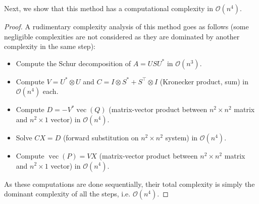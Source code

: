 \documentclass[11pt]{article}
\newcommand{\kp}{\otimes}
\DeclareMathOperator{\vect}{vec}
\newcommand{\bo}{\mathcal{O}}
\begin{document}
Next, we show that this method has a computational complexity in \(\bo(n^4)\).
\begin{proof}
A rudimentary complexity analysis of this method goes as follows (some negligible complexities are not considered as they are dominated by another complexity in the same step):
\begin{itemize}
	\item Compute the Schur decomposition of \(A = U S U^*\) in \(\bo(n^3)\).
	\item Compute \(V = U^* \kp U\) and \(C = I \kp S^* + S^\top \kp I\) (Kronecker product, sum) in \(\bo(n^4)\) each.
	\item Compute \(D = -V^* \vect(Q)\) (matrix-vector product between \(n^2 \times n^2\) matrix and \(n^2 \times 1\) vector) in \(\bo(n^4)\).
	\item Solve \(C X = D\) (forward substitution on \(n^2 \times n^2\) system) in \(\bo(n^4)\).
	\item Compute \(\vect(P) = VX\) (matrix-vector product between \(n^2 \times n^2\) matrix and \(n^2 \times 1\) vector) in \(\bo(n^4)\).
\end{itemize}
As these computations are done sequentially, their total complexity is simply the dominant complexity of all the steps, i.e. \(\bo(n^4)\).
\end{proof}
\end{document}
